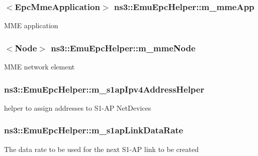 \subsubsection[{\texorpdfstring{m\+\_\+mme\+App}{m_mmeApp}}]{$<${\bf Epc\+Mme\+Application}$>$ ns3\+::\+Emu\+Epc\+Helper\+::m\+\_\+mme\+App\hspace{0.3cm}{\ttfamily [private]}}\hypertarget{classns3_1_1EmuEpcHelper_a20264a8bd8b295161b08d09e4794f02f}{}\label{classns3_1_1EmuEpcHelper_a20264a8bd8b295161b08d09e4794f02f}
M\+ME application 
\subsubsection[{\texorpdfstring{m\+\_\+mme\+Node}{m_mmeNode}}]{$<${\bf Node}$>$ ns3\+::\+Emu\+Epc\+Helper\+::m\+\_\+mme\+Node\hspace{0.3cm}{\ttfamily [private]}}\hypertarget{classns3_1_1EmuEpcHelper_aef136870f0ad1c40d3e139f34ff9f5d1}{}\label{classns3_1_1EmuEpcHelper_aef136870f0ad1c40d3e139f34ff9f5d1}
M\+ME network element 
\subsubsection[{\texorpdfstring{m\+\_\+s1ap\+Ipv4\+Address\+Helper}{m_s1apIpv4AddressHelper}}]{ ns3\+::\+Emu\+Epc\+Helper\+::m\+\_\+s1ap\+Ipv4\+Address\+Helper\hspace{0.3cm}{\ttfamily [private]}}\hypertarget{classns3_1_1EmuEpcHelper_af71f1e0e4c76588bf8c7565484614c08}{}\label{classns3_1_1EmuEpcHelper_af71f1e0e4c76588bf8c7565484614c08}
helper to assign addresses to S1-\/\+AP Net\+Devices 
\subsubsection[{\texorpdfstring{m\+\_\+s1ap\+Link\+Data\+Rate}{m_s1apLinkDataRate}}]{ ns3\+::\+Emu\+Epc\+Helper\+::m\+\_\+s1ap\+Link\+Data\+Rate\hspace{0.3cm}{\ttfamily [private]}}\hypertarget{classns3_1_1EmuEpcHelper_ac0b5058393492c89ecacfe6324cdef69}{}\label{classns3_1_1EmuEpcHelper_ac0b5058393492c89ecacfe6324cdef69}
The data rate to be used for the next S1-\/\+AP link to be created 
